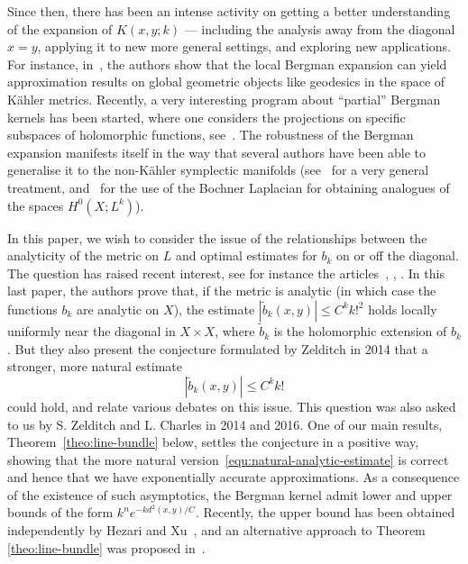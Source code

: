 \documentclass{article}
\newcommand{\abs}[1]{\left|#1\right|}
\begin{document}
Since then, there has been an intense activity on getting a better
understanding of the expansion of $K(x,y;k)$ --- including the
analysis away from the diagonal $x=y$, applying it to new more general
settings, and exploring new applications. For instance,
in~\cite{Song-Zelditch10}, the authors show that the local Bergman
expansion can yield approximation results on global geometric objects
like geodesics in the space of Kähler metrics. Recently, a very
interesting program about ``partial'' Bergman kernels has been
started, where one considers the projections on specific subspaces of
holomorphic functions, see~\cite{Zelditch-Zhou19}. The robustness of
the Bergman expansion manifests itself in the way that several authors
have been able to generalise it to the non-Kähler symplectic manifolds
(see~\cite{Charles2016} for a very general treatment,
and~\cite{kordyukov18} for the use of the Bochner Laplacian for
obtaining analogues of the spaces $H^0(X; L^k)$).

In this paper, we wish to consider the issue of the relationships
between the analyticity of the metric on $L$ and optimal estimates for
$b_k$ on or off the diagonal. The question has raised recent interest,
see for instance the articles~\cite{christ-13}, \cite{christ-13b},
\cite{hezari-lu-xu17}. In this last paper, the authors prove that, if
the metric is analytic (in which case the functions $b_k$ are analytic
on $X$), the estimate $\abs{\tilde b_k(x,y)} \leq C^k k!^2$ holds
locally uniformly near the diagonal in $X\times X$, where $\tilde b_k$
is the holomorphic extension of $b_k$.  But they also present the
conjecture formulated by Zelditch in 2014 that a stronger, more
natural estimate
\begin{equation}
  \label{equ:natural-analytic-estimate}
  \abs{\tilde b_k(x,y)} \leq C^k k!
\end{equation}
could hold, and relate various debates on this issue. This question
was also asked to us by S. Zelditch and L. Charles in 2014 and 2016.
One of our main results, Theorem~\ref{theo:line-bundle} below, settles
the conjecture in a positive way, showing that the more natural
version~\eqref{equ:natural-analytic-estimate} is correct and hence
that we have exponentially accurate approximations. As a consequence
of the existence of such asymptotics, the Bergman kernel admit lower
and upper bounds of the form $k^ne^{-k d^2(x,y)/C}$.  Recently, the
upper bound has been obtained independently by Hezari and
Xu~\cite{hezari-xu18}, and an alternative approach to Theorem
\ref{theo:line-bundle} was proposed
in~\cite{deleporte18,charles2019analytic,hezari2019property}.
\end{document}
